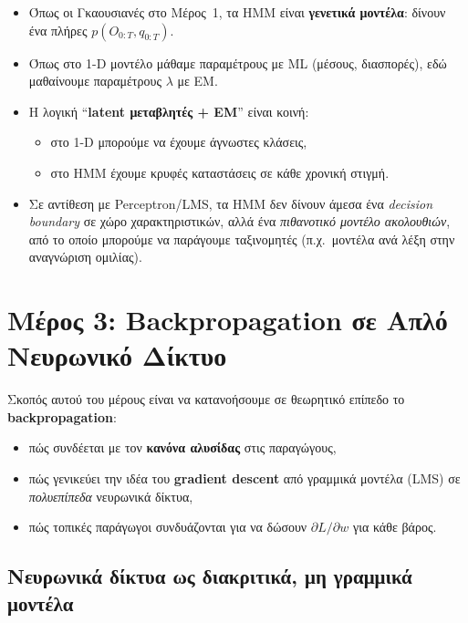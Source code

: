 \documentclass[a4paper,11pt]{article}
\begin{document}
\begin{itemize}
  \item Όπως οι Γκαουσιανές στο Μέρος~1, τα HMM είναι \textbf{γενετικά μοντέλα}:
        δίνουν ένα πλήρες $p(O_{0:T},q_{0:T})$.
  \item Όπως στο 1-D μοντέλο μάθαμε παραμέτρους με ML (μέσους, διασπορές),
        εδώ μαθαίνουμε παραμέτρους $\lambda$ με EM.
  \item Η λογική ``\textbf{latent μεταβλητές + EM}'' είναι κοινή:
        \begin{itemize}
          \item στο 1-D μπορούμε να έχουμε άγνωστες κλάσεις,
          \item στο HMM έχουμε κρυφές καταστάσεις σε κάθε χρονική στιγμή.
        \end{itemize}
  \item Σε αντίθεση με Perceptron/LMS, τα HMM δεν δίνουν άμεσα ένα
        \emph{decision boundary} σε χώρο χαρακτηριστικών, αλλά ένα
        \emph{πιθανοτικό μοντέλο ακολουθιών}, από το οποίο μπορούμε να
        παράγουμε ταξινομητές (π.χ.\ μοντέλα ανά λέξη στην αναγνώριση ομιλίας).
\end{itemize}

\clearpage

\section{Μέρος 3: Backpropagation σε Απλό Νευρωνικό Δίκτυο}

Σκοπός αυτού του μέρους είναι να κατανοήσουμε σε θεωρητικό επίπεδο
το \textbf{backpropagation}:

\begin{itemize}
  \item πώς συνδέεται με τον \textbf{κανόνα αλυσίδας} στις παραγώγους,
  \item πώς γενικεύει την ιδέα του \textbf{gradient descent} από γραμμικά
        μοντέλα (LMS) σε \emph{πολυεπίπεδα} νευρωνικά δίκτυα,
  \item πώς τοπικές παράγωγοι συνδυάζονται για να δώσουν
        $\partial L / \partial w$ για κάθε βάρος.
\end{itemize}

\subsection{Νευρωνικά δίκτυα ως διακριτικά, μη γραμμικά μοντέλα}
\end{document}
